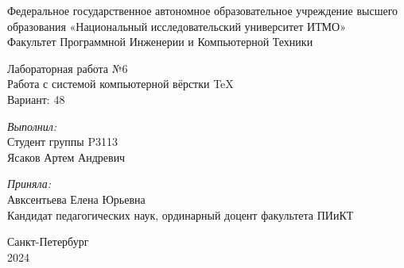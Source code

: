 \begin{center}
\large Федеральное государственное автономное образовательное учреждение высшего образования «Национальный исследовательский университет ИТМО»\\
Факультет Программной Инженерии и Компьютерной Техники\\
\hfill 


\vspace{5.5cm}
\Large Лабораторная работа №6 \\
Работа с системой компьютерной вёрстки \TeX \\
Вариант: 48\\
\end{center}

\vspace{2.5cm}
 
\begin{flushright}
\textit{Выполнил:}\\
Студент группы P3113\\
Ясаков Артем Андревич\

\textit{Приняла:}\\
Авксентьева Елена Юрьевна \\
Кандидат педагогических наук, ординарный доцент факультета ПИиКТ\\
\end{flushright}
 
\vfill

\begin{center} Санкт-Петербург\\2024 \end{center}

\thispagestyle{empty}
\newpage